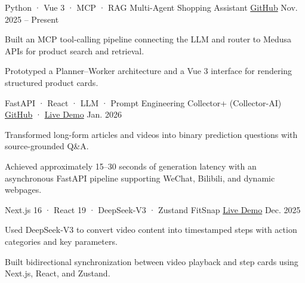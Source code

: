 
\begin{cventries}

  \cventry
    {Python · Vue 3 · MCP · RAG}
    {Multi-Agent Shopping Assistant}
    {\href{https://github.com/YifeiWang0618/Multi-Agent}{GitHub}}
    {Nov. 2025 -- Present}
    {
      \begin{cvitems}
        \item {Built an MCP tool-calling pipeline connecting the LLM and router to Medusa APIs for product search and retrieval.}
        \item {Prototyped a Planner--Worker architecture and a Vue 3 interface for rendering structured product cards.}
      \end{cvitems}
    }

\vspace{0.8cm} %
  \cventry
    {FastAPI · React · LLM · Prompt Engineering}
    {Collector+ (Collector-AI)}
    {\href{https://github.com/YifeiWang0618/Creator_ai}{GitHub} · \href{https://collectorai.top/}{Live Demo}}
    {Jan. 2026}
    {
      \begin{cvitems}
        \item {Transformed long-form articles and videos into binary prediction questions with source-grounded Q\&A.}
        \item {Achieved approximately 15--30 seconds of generation latency with an asynchronous FastAPI pipeline supporting WeChat, Bilibili, and dynamic webpages.}
      \end{cvitems}
    }
    
\vspace{0.8cm} %
  \cventry
    {Next.js 16 · React 19 · DeepSeek-V3 · Zustand}
    {FitSnap}
    {\href{https://fit-snap-beige.vercel.app/}{Live Demo}}
    {Dec. 2025}
    {
      \begin{cvitems}
        \item {Used DeepSeek-V3 to convert video content into timestamped steps with action categories and key parameters.}
        \item {Built bidirectional synchronization between video playback and step cards using Next.js, React, and Zustand.}
      \end{cvitems}
    }
    

\end{cventries}
